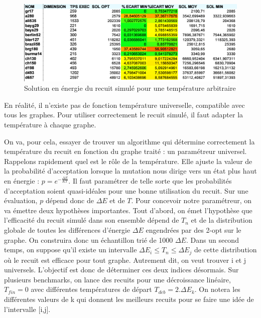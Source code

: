 \documentclass{article}%
\begin{document}
	\begin{figure}[!h]
	\begin{center}
	\includegraphics[scale=0.4]{perf_random_sa.png}
	\caption{Solution en énergie du recuit simulé pour une température arbitraire}
	\label{perf_random_sa}
	\end{center}
	\end{figure}
	
		En réalité, il n'existe pas de fonction température universelle, compatible avec tous les graphes. Pour utiliser correctement le recuit simulé, il faut adapter la température à chaque graphe.
		
		\vspace{1cm}
		
		On va, pour cela, essayer de trouver un algorithme qui détermine correctement la température du recuit en fonction du graphe traité : un paramétreur universel.
		Rappelons rapidement quel est le rôle de la température. Elle ajuste la valeur de la probabilité d'acceptation lorsque la mutation nous dirige vers un état plus haut en énergie : $ p = e^{-\frac{\Delta E}{KT}} $. Il faut paramétrer de telle sorte que les probabilités d'acceptation soient quasi-idéales pour une bonne utilisation du recuit. Sur une évaluation, $ p $  dépend donc de $ \Delta E $ et de $ T $. 
		Pour concevoir notre paramétreur, on va émettre deux hypothèses importantes. Tout d'abord, on émet l'hypothèse que l'efficacité du recuit simulé dans son ensemble dépend de $ T_{n} $ et de la distribution globale de toutes les différences d'énergie $ \Delta E $ engendrées par des 2-opt sur le graphe. On construira donc un échantillon trié de 1000 $ \Delta E $. Dans un second temps, on suppose qu'il existe un intervalle $ \Delta E_{i} \leq T_{n} \leq \Delta E_{j} $ de cette distribution où le recuit est efficace pour tout graphe. Autrement dit, on veut trouver i et j universels. 
		L'objectif est donc de déterminer ces deux indices désormais. Sur plusieurs benchmarks, on lance des recuits pour une décroissance linéaire, $ T_{fin} = 0 $ avec différentes températures de départ $ T_{deb} = 2.\Delta E_{k} $. On notera les différentes valeurs de k qui donnent les meilleurs recuits pour se faire une idée de l'intervalle [i,j].
		
\end{document}
